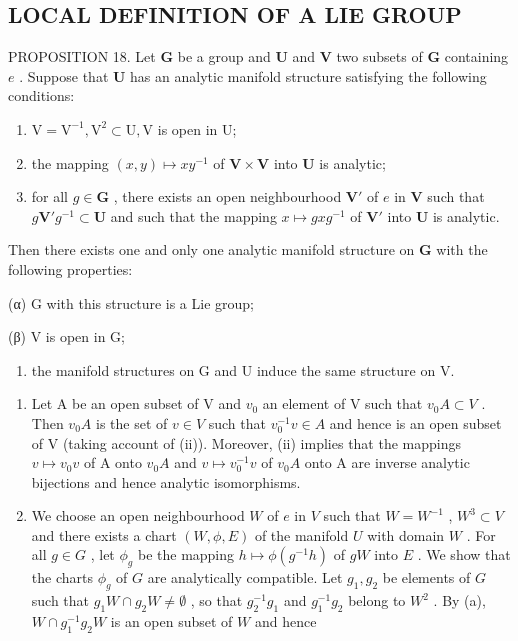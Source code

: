 \subsection{LOCAL DEFINITION OF A LIE GROUP}

PROPOSITION 18. Let \(\mathbf{G}\) be a group and \(\mathbf{U}\) and \(\mathbf{V}\) two subsets of \(\mathbf{G}\) containing \(e\) . Suppose that \(\mathbf{U}\) has an analytic manifold structure satisfying the following conditions:

\begin{enumerate}
\def\labelenumi{(\roman{enumi})}
\item
  \(\mathrm{V} = \mathrm{V}^{-1},\mathrm{V}^2\subset \mathrm{U},\mathrm{V}\) is open in U;
\item
  the mapping \((x,y)\mapsto xy^{-1}\) of \(\mathbf{V}\times \mathbf{V}\) into \(\mathbf{U}\) is analytic;
\item
  for all \(g \in \mathbf{G}\) , there exists an open neighbourhood \(\mathbf{V}'\) of \(e\) in \(\mathbf{V}\) such that \(g\mathbf{V}'g^{-1} \subset \mathbf{U}\) and such that the mapping \(x \mapsto gxg^{-1}\) of \(\mathbf{V}'\) into \(\mathbf{U}\) is analytic.
\end{enumerate}

Then there exists one and only one analytic manifold structure on \(\mathbf{G}\) with the following properties:

(α) G with this structure is a Lie group;

(β) V is open in G;

\begin{enumerate}
\def\labelenumi{(\Alph{enumi})}
\setcounter{enumi}{24}
\tightlist
\item
  the manifold structures on G and U induce the same structure on V.
\end{enumerate}

\begin{enumerate}
\def\labelenumi{(\alph{enumi})}
\item
  Let A be an open subset of V and \(v_{0}\) an element of V such that \(v_{0}A \subset V\) . Then \(v_{0}A\) is the set of \(v \in V\) such that \(v_{0}^{-1}v \in A\) and hence is an open subset of V (taking account of (ii)). Moreover, (ii) implies that the mappings \(v \mapsto v_{0}v\) of A onto \(v_{0}A\) and \(v \mapsto v_{0}^{-1}v\) of \(v_{0}A\) onto A are inverse analytic bijections and hence analytic isomorphisms.
\item
  We choose an open neighbourhood \(W\) of \(e\) in \(V\) such that \(W = W^{-1}\) , \(W^3 \subset V\) and there exists a chart \((W, \phi, E)\) of the manifold \(U\) with domain \(W\) . For all \(g \in G\) , let \(\phi_g\) be the mapping \(h \mapsto \phi(g^{-1}h)\) of \(gW\) into \(E\) . We show that the charts \(\phi_g\) of \(G\) are analytically compatible. Let \(g_1, g_2\) be elements of \(G\) such that \(g_1W \cap g_2W \neq \emptyset\) , so that \(g_2^{-1}g_1\) and \(g_1^{-1}g_2\) belong to \(W^2\) . By (a), \(W \cap g_1^{-1}g_2W\) is an open subset of \(W\) and hence
\end{enumerate}

